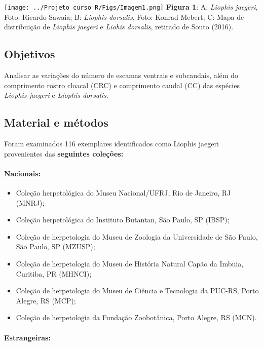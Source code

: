 \documentclass[
]{article}
\begin{document}
\texttt{[image: ../Projeto curso R/Figs/Imagem1.png]} \textbf{Figura 1}:
A: \emph{Liophis jaegeri}, Foto: Ricardo Sawaia; B: \emph{Liophis
dorsalis}, Foto: Konrad Mebert; C: Mapa de distribuição de \emph{Liophis
jaegeri} e \emph{Liohis dorsalis}, retirado de Souto (2016).

\hypertarget{objetivos}{%
\subsection{Objetivos}\label{objetivos}}

Analisar as variações do número de escamas ventrais e subcaudais, além
do comprimento rostro cloacal (CRC) e comprimento caudal (CC) das
espécies \emph{Liophis jaegeri} e \emph{Liophis dorsalis}.

\hypertarget{material-e-muxe9todos}{%
\subsection{Material e métodos}\label{material-e-muxe9todos}}

Foram examinados 116 exemplares identificados como Liophis jaegeri
provenientes das \textbf{seguintes coleções:}

\hypertarget{nacionais}{%
\paragraph{Nacionais:}\label{nacionais}}

\begin{itemize}
\item
  Coleção herpetológica do Museu Nacional/UFRJ, Rio de Janeiro, RJ
  (MNRJ);
\item
  Coleção herpetológica do Instituto Butantan, São Paulo, SP (IBSP);
\item
  Coleção de herpetologia do Museu de Zoologia da Universidade de São
  Paulo, São Paulo, SP (MZUSP);
\item
  Coleção de herpetologia do Museu de História Natural Capão da Imbuia,
  Curitiba, PR (MHNCI);
\item
  Coleção de herpetologia do Museu de Ciência e Tecnologia da PUC-RS,
  Porto Alegre, RS (MCP);
\item
  Coleção de herpetologia da Fundação Zoobotânica, Porto Alegre, RS
  (MCN).
\end{itemize}

\hypertarget{estrangeiras}{%
\paragraph{Estrangeiras:}\label{estrangeiras}}
\end{document}
